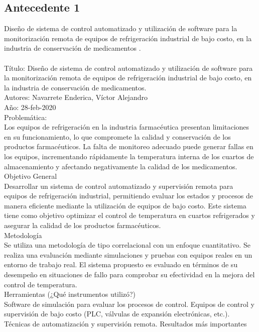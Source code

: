 \subsection{Antecedente 1}
Diseño de sistema de control automatizado y utilización de software para
la monitorización remota de equipos de refrigeración industrial de bajo costo,
en la industria de conservación de medicamentos \cite{Nava}.\\ \\
Título: Diseño de sistema de control automatizado y utilización de software para la monitorización remota de equipos de refrigeración industrial de bajo costo, en la industria de conservación de medicamentos.\\
Autores: Navarrete Enderica, Víctor Alejandro \\
Año: 28-feb-2020 \\
Problemática: \\
Los equipos de refrigeración en la industria farmacéutica presentan limitaciones en su funcionamiento, lo que compromete la calidad y conservación de los productos farmacéuticos. La falta de monitoreo adecuado puede generar fallas en los equipos, incrementando rápidamente la temperatura interna de los cuartos de almacenamiento y afectando negativamente la calidad de los medicamentos.\\
Objetivo General \\
Desarrollar un sistema de control automatizado y supervisión remota para equipos de refrigeración industrial, permitiendo evaluar los estados y procesos de manera eficiente mediante la utilización de equipos de bajo costo. Este sistema tiene como objetivo optimizar el control de temperatura en cuartos refrigerados y asegurar la calidad de los productos farmacéuticos.\\
Metodología \\
Se utiliza una metodología de tipo correlacional con un enfoque cuantitativo. Se realiza una evaluación mediante simulaciones y pruebas con equipos reales en un entorno de trabajo real. El sistema propuesto es evaluado en términos de su desempeño en situaciones de fallo para comprobar su efectividad en la mejora del control de temperatura.\\
Herramientas (¿Qué instrumentos utilizó?)\\
Software de simulación para evaluar los procesos de control.
Equipos de control y supervisión de bajo costo (PLC, válvulas de expansión electrónicas, etc.).
Técnicas de automatización y supervisión remota.
Resultados más importantes \\
